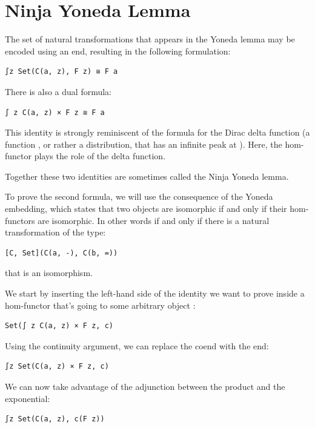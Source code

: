 \section{Ninja Yoneda Lemma}\label{ninja-yoneda-lemma}

The set of natural transformations that appears in the Yoneda lemma may
be encoded using an end, resulting in the following formulation:

\begin{verbatim}
∫z Set(C(a, z), F z) ≅ F a
\end{verbatim}

There is also a dual formula:

\begin{verbatim}
∫ z C(a, z) × F z ≅ F a
\end{verbatim}

This identity is strongly reminiscent of the formula for the Dirac delta
function (a function , or rather a distribution, that
has an infinite peak at ). Here, the hom-functor plays
the role of the delta function.

Together these two identities are sometimes called the Ninja Yoneda
lemma.

To prove the second formula, we will use the consequence of the Yoneda
embedding, which states that two objects are isomorphic if and only if
their hom-functors are isomorphic. In other words  if
and only if there is a natural transformation of the type:

\begin{verbatim}
[C, Set](C(a, -), C(b, =))
\end{verbatim}

that is an isomorphism.

We start by inserting the left-hand side of the identity we want to
prove inside a hom-functor that's going to some arbitrary object
:

\begin{verbatim}
Set(∫ z C(a, z) × F z, c)
\end{verbatim}

Using the continuity argument, we can replace the coend with the end:

\begin{verbatim}
∫z Set(C(a, z) × F z, c)
\end{verbatim}

We can now take advantage of the adjunction between the product and the
exponential:

\begin{verbatim}
∫z Set(C(a, z), c(F z))
\end{verbatim}

